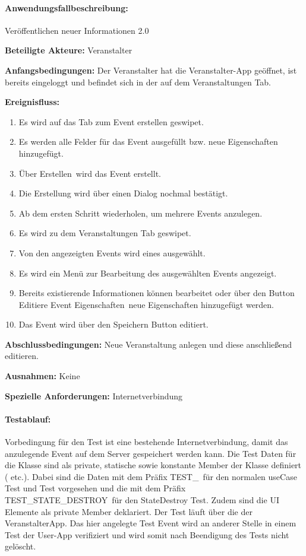 \paragraph{Anwendungsfallbeschreibung:} Veröffentlichen neuer Informationen 2.0

\textbf{Beteiligte Akteure:}
	Veranstalter
	
\textbf{Anfangsbedingungen:}
	Der Veranstalter hat die Veranstalter-App geöffnet, ist bereits eingeloggt und befindet sich in der  auf dem Veranstaltungen Tab.
	
\textbf{Ereignisfluss:}
	\begin{enumerate}
		\item Es wird  auf das Tab zum Event erstellen geswipet.
		\item Es werden alle Felder für das Event ausgefüllt bzw. neue Eigenschaften hinzugefügt.
		\item Über \glqq Erstellen\grqq\ wird das Event erstellt.
		\item Die Erstellung wird über einen Dialog nochmal bestätigt.
		\item Ab dem ersten Schritt wiederholen, um mehrere Events anzulegen.
		\item Es wird zu dem Veranstaltungen Tab geswipet.
		\item Von den angezeigten Events wird eines ausgewählt.
		\item Es wird ein Menü zur Bearbeitung des ausgewählten Events angezeigt.
		\item Bereits existierende Informationen können bearbeitet oder über den Button \glqq Editiere Event Eigenschaften\grqq\ neue Eigenschaften hinzugefügt werden.
		\item Das Event wird über den Speichern Button editiert.
	\end{enumerate}
	
\textbf{Abschlussbedingungen:}
	Neue Veranstaltung anlegen und diese anschließend editieren.
	
\textbf{Ausnahmen:}
	Keine
	
\textbf{Spezielle Anforderungen:}
	Internetverbindung

\paragraph{Testablauf:}
Vorbedingung für den Test ist eine bestehende Internetverbindung, damit das anzulegende Event auf dem Server gespeichert werden kann.
Die Test Daten für die Klasse sind als private, statische sowie konstante Member der Klasse definiert ( etc.). Dabei sind die Daten mit dem Präfix \glqq TEST\_\grqq\ für den normalen useCase Test und  Test vorgesehen und die mit dem Präfix \glqq TEST\_STATE\_DESTROY\grqq\ für den StateDestroy Test. Zudem sind die UI Elemente als private Member deklariert.
Der Test läuft über die  der \glqq VeranstalterApp\grqq. Das hier angelegte Test Event wird an anderer Stelle in einem Test der User-App   verifiziert und wird somit nach Beendigung des Tests nicht gelöscht.

